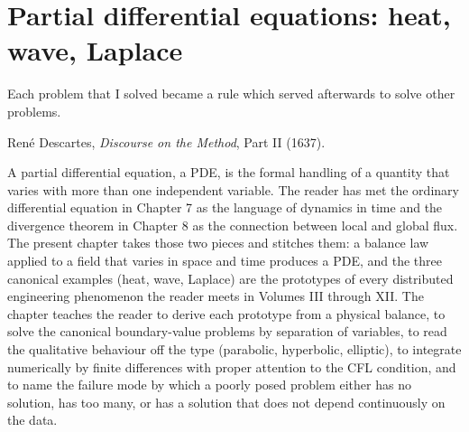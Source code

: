\chapter{Partial differential equations: heat, wave, Laplace}
\label{vol02:ch12}

\epigraph{Each problem that I solved became a rule which served afterwards to solve other problems.}{Ren\'e Descartes, \textit{Discourse on the Method}, Part II (1637).}


\noindent
A partial differential equation, a PDE, is the formal handling of a
quantity that varies with more than one independent variable. The
reader has met the ordinary differential equation in Chapter 7 as
the language of dynamics in time and the divergence theorem in
Chapter 8 as the connection between local and global flux. The
present chapter takes those two pieces and stitches them: a balance
law applied to a field that varies in space and time produces a
PDE, and the three canonical examples (heat, wave, Laplace) are
the prototypes of every distributed engineering phenomenon the
reader meets in Volumes III through XII. The chapter teaches the
reader to derive each prototype from a physical balance, to solve
the canonical boundary-value problems by separation of variables,
to read the qualitative behaviour off the type (parabolic,
hyperbolic, elliptic), to integrate numerically by finite
differences with proper attention to the CFL condition, and to
name the failure mode by which a poorly posed problem either has no
solution, has too many, or has a solution that does not depend
continuously on the data.

